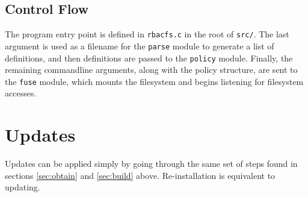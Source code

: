 \documentclass[11pt,oneside,letterpaper]{article}
\begin{document}
\subsection{Control Flow}

The program entry point is defined in {\tt rbacfs.c} in the root of {\tt src/}. The last argument is used as a filename for the {\tt parse} module to
generate a list of definitions, and then definitions are passed to the
{\tt policy} module. Finally, the remaining commandline arguments, along
with the policy structure, are sent to the {\tt fuse} module, which
mounts the filesystem and begins listening for filesystem accesses.

\section{Updates}

Updates can be applied simply by going through the same set of steps found
in sections \ref{sec:obtain} and \ref{sec:build} above. Re-installation is
equivalent to updating.
\end{document}
